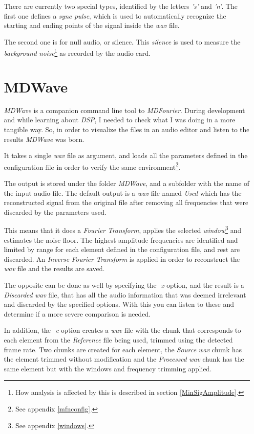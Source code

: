 \documentclass[10pt,a4paper]{report}
\newcommand{\ac}[1]{\textit{\acrshort{#1}}}
\begin{document}
\begin{appendices}
There are currently two special types, identified by the letters \textit{'s'} and \textit{'n'}. The first one defines a \textit{sync pulse}, which is used to automatically recognize the starting and ending points of the signal inside the \ac{wav} file. 

The second one is for null audio, or silence. This \textit{silence} is used to measure the \textit{background noise}\footnote{How analysis is affected by this is described in section \ref{MinSigAmplitude}.} as recorded by the audio card. 	

\chapter{MDWave}
\label{mdwave}

\textit{MDWave} is a companion command line tool to \textit{MDFourier}. During development and while learning about \textit{DSP}, I needed to check what I was doing in a more tangible way. So, in order to visualize the files in an audio editor and listen to the results \textit{MDWave} was born.

It takes a single \ac{wav} file as argument, and loads all the parameters defined in the configuration file in order to verify the same environment\footnote{See appendix \ref{mfnconfig}.}.

The output is stored under the folder \textit{MDWave}, and a subfolder with the name of the input audio file. The default output is a \ac{wav} file named \textit{Used} which has the reconstructed signal from the original file after removing all frequencies that were discarded by the parameters used.

This means that it does a \textit{Fourier Transform}, applies the selected \textit{window}\footnote{See appendix \ref{windows}.} and estimates the noise floor. The highest amplitude frequencies are identified and limited by range for each element defined in the configuration file, and rest are discarded. An \textit{Inverse Fourier Transform} is applied in order to reconstruct the \ac{wav} file and the results are saved.

The opposite can be done as well by specifying the \textit{-x} option, and the result is a \textit{Discarded} \ac{wav} file, that has all the audio information that was deemed irrelevant and discarded by the specified options. With this you can listen to these and determine if a more severe comparison is needed.

In addition, the \textit{-c} option creates a \ac{wav} file with the chunk that corresponds to each element from the \textit{Reference} file being used, trimmed using the detected frame rate. Two chunks are created for each element, the \textit{Source} \ac{wav} chunk has the element trimmed without modification and the \textit{Processed} \ac{wav} chunk has the same element but with the windows and frequency trimming applied.


\end{appendices}
\end{document}
